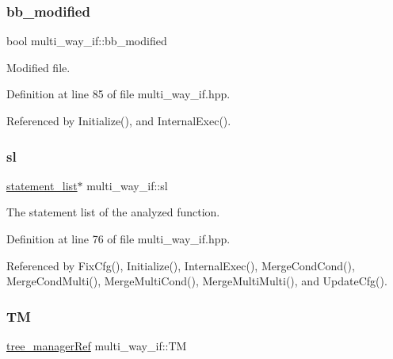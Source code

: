 \subsubsection{\texorpdfstring{bb\+\_\+modified}{bb\_modified}}
{\footnotesize\ttfamily bool multi\+\_\+way\+\_\+if\+::bb\+\_\+modified\hspace{0.3cm}{\ttfamily [private]}}



Modified file. 



Definition at line 85 of file multi\+\_\+way\+\_\+if.\+hpp.



Referenced by Initialize(), and Internal\+Exec().

\mbox{\label{classmulti__way__if_ab60cc09060810013c1a138209e85405c}} 
\subsubsection{\texorpdfstring{sl}{sl}}
{\footnotesize\ttfamily \hyperlink{structstatement__list}{statement\+\_\+list}$\ast$ multi\+\_\+way\+\_\+if\+::sl\hspace{0.3cm}{\ttfamily [private]}}



The statement list of the analyzed function. 



Definition at line 76 of file multi\+\_\+way\+\_\+if.\+hpp.



Referenced by Fix\+Cfg(), Initialize(), Internal\+Exec(), Merge\+Cond\+Cond(), Merge\+Cond\+Multi(), Merge\+Multi\+Cond(), Merge\+Multi\+Multi(), and Update\+Cfg().

\mbox{\label{classmulti__way__if_afcac541c14e9f6b9e13c434315673023}} 
\subsubsection{\texorpdfstring{TM}{TM}}
{\footnotesize\ttfamily \hyperlink{tree__manager_8hpp_a96ff150c071ce11a9a7a1e40590f205e}{tree\+\_\+manager\+Ref} multi\+\_\+way\+\_\+if\+::\+TM\hspace{0.3cm}{\ttfamily [private]}}




